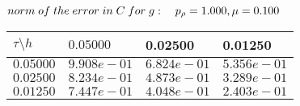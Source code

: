 
 $norm\;of\;the\;error\;in\;C\;for\;g: \quad p_{\rho}=1.000, \mu = 0.100 \\ $
\begin{tabular}{|p{0.6in}|p{1.2in}|p{1.2in}|p{1.2in}|} \hline
$\tau\setminus h$ & $0.05000 $ & 0.02500 & 0.01250 \\ \hline
$0.05000$ & $9.908e-01$ &$6.824e-01$ &$5.356e-01$  \\ \hline
$0.02500$ & $8.234e-01$ &$4.873e-01$ &$3.289e-01$  \\ \hline
$0.01250$ & $7.447e-01$ &$4.048e-01$ &$2.403e-01$  \\ \hline
\end{tabular}\\[20pt]
